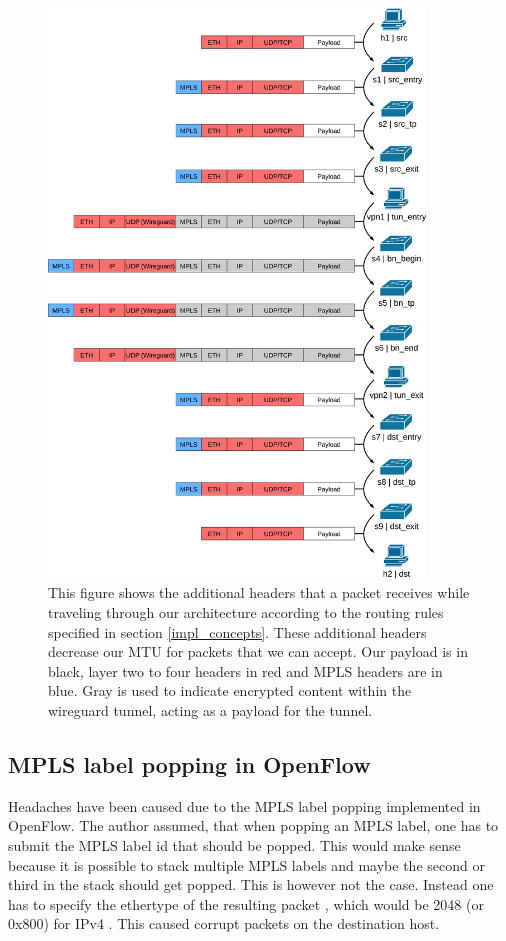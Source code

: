 \begin{figure}[hp]
  \centering
  \includegraphics[width=10cm]{images/chapter_6/packet_structure.png}
  \caption[Additional headers of packets]{This figure shows the additional headers that a packet receives while traveling through our architecture according to the routing rules specified in section \ref{impl_concepts}. These additional headers decrease our MTU for packets that we can accept. Our payload is in black, layer two to four headers in red and MPLS headers are in blue. Gray is used to indicate encrypted content within the wireguard tunnel, acting as a payload for the tunnel.}
  \label{fig:packet_structure}
\end{figure}

\subsection{MPLS label popping in OpenFlow}
Headaches have been caused due to the MPLS label popping implemented in OpenFlow. The author assumed, that when popping an MPLS label, one has to submit the MPLS label id that should be popped. This would make sense because it is possible to stack multiple MPLS labels and maybe the second or third in the stack should get popped. This is however not the case. Instead one has to specify the ethertype of the resulting packet \cite{openflow}, which would be 2048 (or 0x800) for IPv4 \cite{rfc7042}. This caused corrupt packets on the destination host.

